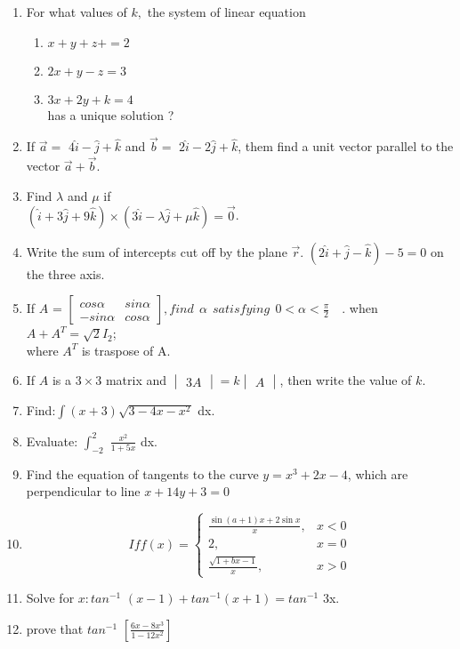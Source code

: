\documentclass[12pt,-letter paper]{article}
\providecommand{\mydet}[1]{\ensuremath{\begin{vmatrix}#1\end{vmatrix}}}
\providecommand{\myvec}[1]{\ensuremath{\begin{bmatrix}#1\end{bmatrix}}}
\providecommand{\brak}[1]{\ensuremath{\left(#1\right)}}
\begin{document}
\begin{enumerate}
	\item    For what values of $ k, $ the system of linear equation
      \begin{enumerate}
      \item $ x+y+z+=2 $
      \item $ 2x+y-z=3 $
      \item $ 3x+2y+k=4 $ \\
       has a unique solution ?      
      \end{enumerate}
\item If $\overrightarrow{a}=$ $4\hat{i}-\hat{j}+\hat{k}$ and $\overrightarrow{b}=$ $2\hat{i}-2\hat{j}+\hat{k}$, them find a unit vector parallel to the vector $\overrightarrow{a}+\overrightarrow{b}.$
\item Find $\lambda$ and $\mu$ if \\
	$\brak{\hat{i}+3\hat{j}+9\hat{k}}\times\brak{3\hat{i}-\lambda\hat{j}+\mu\hat{k}}=\overrightarrow{0}$.
\item Write the sum of intercepts cut off by the plane $\overrightarrow{r}$. $\brak{2\hat{i}+\hat{j}-\hat{k}}-5=0$ on the three axis.
\item If $A$ = $\myvec{cos \alpha & sin \alpha \\ -sin \alpha & cos \alpha}, find\ \ \alpha\ \ satisfying\ \ 0< \alpha < \frac{\pi}{2}$\ \
. when\  \ $A+A^{T}=\sqrt{2}I_{2}$; \\ where $A^{T}$ is traspose of A.
\item If $A$ is a $3\times3$ matrix and $\mydet{3A}=k\mydet{A}$, then write the value of $k.$ 	
\item Find:$\int$\brak{x+3}$\sqrt{3-4x-x^2}$ dx.	
\item Evaluate: $\int_{-2}^{2}$ $\frac{x^2}{1+5x}$ dx.
\item Find the equation of tangents to the curve $y=x^3+2x-4$, which are perpendicular to line $x+14y+3=0 $
\item \[ If f(x)=
	\begin{cases}
		\frac{\sin(a+1)x + 2\sin x}{x},& x<0 \\
		        2, &x = 0 \\
		\frac{\sqrt{1+bx-1}}{x}, & x>0
	\end{cases}
		\]
\item Solve for $x:tan^{-1}$ $\brak{x-1}+tan^{-1}\brak{x+1}=tan^{-1}$ 3x.
\item prove that $tan^{-1}$ $[\frac{6x-8x^3}{1-12x^2}]$

\end{enumerate}
\end{document}
